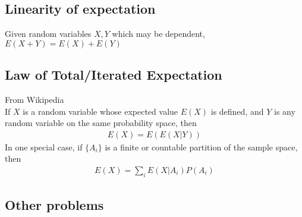 \documentclass{article}
\begin{document}
\subsection{Linearity of expectation}
Given random variables $X,Y$ which may be dependent, $E(X+Y)=E(X)+E(Y)$

\subsection{Law of Total/Iterated Expectation}
From Wikipedia\\
If $X$ is a random variable whose expected value $E(X)$ is defined, and $Y$ is any random variable on the same probability space, then 
\begin{align*}
	E(X)=E(E(X|Y))
\end{align*}
In one special case, if $\{A_i\}$ is a finite or countable partition of the sample space, then 
\begin{align*}
	E(X)=\sum_iE(X|A_i)P(A_i)
\end{align*}

\subsection{Other problems}
\end{document}
